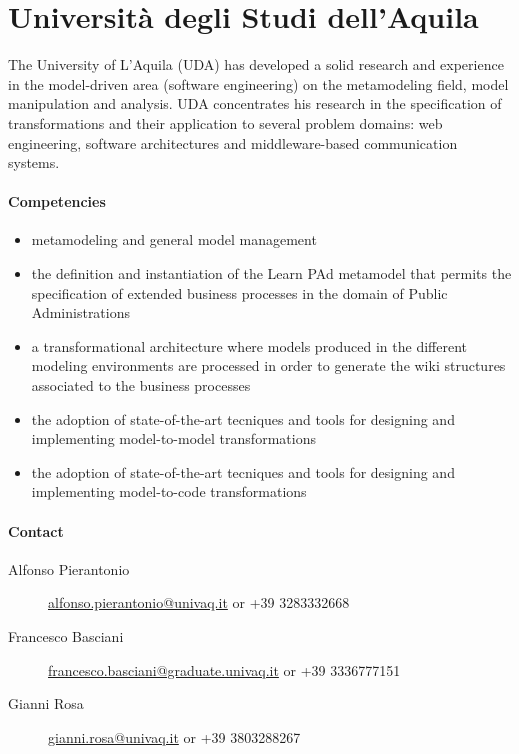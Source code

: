 \documentclass{learnpad}
\begin{document}
\section{Università degli Studi dell'Aquila}
The University of L’Aquila (UDA) has developed a solid research and experience
in the model-driven area (software engineering) on the metamodeling field, model
manipulation and analysis.  UDA concentrates his research in the specification
of transformations and their application to several problem domains: web
engineering, software architectures and middleware-based communication systems.

\paragraph{Competencies}
\begin{itemize}
	\item metamodeling and general model management
	\item the definition and instantiation of the Learn PAd metamodel that
		permits the specification of extended business processes in the domain
		of Public Administrations
	\item a transformational architecture where models produced in the different
		modeling environments are processed in order to generate the wiki
		structures associated to the business processes
	\item the adoption of state-of-the-art tecniques and tools for designing and
		implementing model-to-model transformations
	\item the adoption of state-of-the-art tecniques and tools for designing and
		implementing model-to-code transformations
\end{itemize}

\paragraph{Contact}
\begin{description}
	\item[Alfonso Pierantonio] \href{mailto:alfonso.pierantonio@univaq.it}{alfonso.pierantonio@univaq.it} or +39 3283332668
	\item[Francesco Basciani] \href{mailto:francesco.basciani@graduate.univaq.it}{francesco.basciani@graduate.univaq.it} or +39 3336777151
	\item[Gianni Rosa] \href{mailto:gianni.rosa@univaq.it}{gianni.rosa@univaq.it} or +39 3803288267
\end{description}
\end{document}
